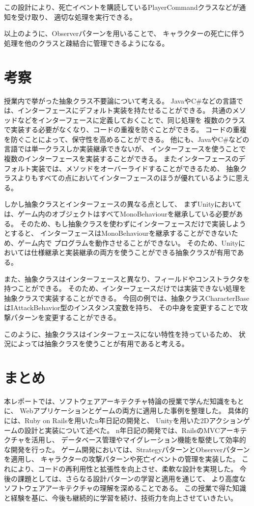 \documentclass[dvipdfmx,fleqn,article]{jlreq}
\begin{document}
この設計により、死亡イベントを購読しているPlayerCommandクラスなどが通知を受け取り、
適切な処理を実行できる。

以上のように、Observerパターンを用いることで、
キャラクターの死亡に伴う処理を他のクラスと疎結合に管理できるようになる。

\section{考察}
授業内で挙がった抽象クラス不要論について考える。
JavaやC\#などの言語では、インターフェースにデフォルト実装を持たせることができる。
共通のメソッドなどをインターフェースに定義しておくことで、同じ処理を
複数のクラスで実装する必要がなくなり、コードの重複を防ぐことができる。
コードの重複を防ぐことによって、保守性を高めることができる。
他にも、JavaやC\#などの言語では単一クラスしか実装継承できないが、
インターフェースを使うことで複数のインターフェースを実装することができる。
またインターフェースのデフォルト実装では、メソッドをオーバーライドすることができるため、
抽象クラスよりもすべての点においてインターフェースのほうが優れているように思える。

しかし抽象クラスとインターフェースの異なる点として、
まずUnityにおいては、ゲーム内のオブジェクトはすべてMonoBehaviourを継承している必要がある。
そのため、もし抽象クラスを使わずにインターフェースだけで実装しようとすると、
インターフェースはMonoBehaviourを継承することができないため、ゲーム内で
プログラムを動作させることができない。
そのため、Unityにおいては仕様継承と実装継承の両方を使うことができる抽象クラスが有用である。

また、抽象クラスはインターフェースと異なり、フィールドやコンストラクタを持つことができる。
そのため、インターフェースだけでは実装できない処理を抽象クラスで実装することができる。
今回の例では、抽象クラスCharacterBaseはIAttackBehavior型のインスタンス変数を持ち、
その中身を変更することで攻撃パターンを変更することができる。

このように、抽象クラスはインターフェースにない特性を持っているため、
状況によっては抽象クラスを使うことが有用であると考える。


\section{まとめ}
本レポートでは、ソフトウェアアーキテクチャ特論の授業で学んだ知識をもとに、
Webアプリケーションとゲームの両方に適用した事例を整理した。
具体的には、Ruby on Railsを用いたn年日記の開発と、
Unityを用いた2Dアクションゲームの設計と実装について述べた。
n年日記の開発では、RailsのMVCアーキテクチャを活用し、
データベース管理やマイグレーション機能を駆使して効率的な開発を行った。
ゲーム開発においては、StrategyパターンとObserverパターンを適用し、
キャラクターの攻撃パターンや死亡イベントの管理を実装した。
これにより、コードの再利用性と拡張性を向上させ、柔軟な設計を実現した。
今後の課題としては、さらなる設計パターンの学習と適用を通じて、
より高度なソフトウェアアーキテクチャの理解を深めることである。
この授業で得た知識と経験を基に、今後も継続的に学習を続け、技術力を向上させていきたい。
\end{document}
